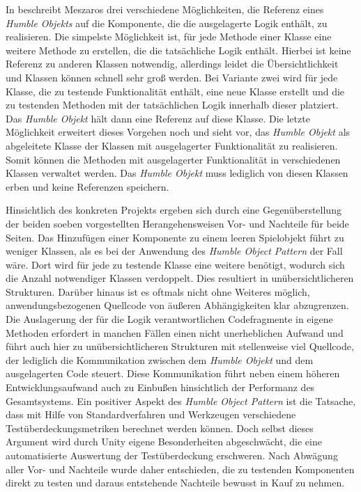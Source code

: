 In \cite{xUnit_Test_Patterns_Refactoring} beschreibt Meszaros drei verschiedene Möglichkeiten, die Referenz eines \textit{Humble Objekts} auf die Komponente, die die ausgelagerte Logik enthält, zu realisieren. Die simpelste Möglichkeit ist, für jede Methode einer Klasse eine weitere Methode zu erstellen, die die tatsächliche Logik enthält. Hierbei ist keine Referenz zu anderen Klassen notwendig, allerdings leidet die Übersichtlichkeit und Klassen können schnell sehr groß werden. Bei Variante zwei wird für jede Klasse, die zu testende Funktionalität enthält, eine neue Klasse erstellt und die zu testenden Methoden mit der tatsächlichen Logik innerhalb dieser platziert. Das \textit{Humble Objekt} hält dann eine Referenz auf diese Klasse. Die letzte Möglichkeit erweitert dieses Vorgehen noch und sieht vor, das \textit{Humble Objekt} als abgeleitete Klasse der Klassen mit ausgelagerter Funktionalität zu realisieren. Somit können die Methoden mit ausgelagerter Funktionalität in verschiedenen Klassen verwaltet werden. Das \textit{Humble Objekt} muss lediglich von diesen Klassen erben und keine Referenzen speichern.

Hinsichtlich des konkreten Projekts ergeben sich durch eine Gegenüberstellung der beiden soeben vorgestellten Herangehensweisen Vor- und Nachteile für beide Seiten. Das Hinzufügen einer Komponente zu einem leeren Spielobjekt führt zu weniger Klassen, als es bei der Anwendung des \textit{Humble Object Pattern} der Fall wäre. Dort wird für jede zu testende Klasse eine weitere benötigt, wodurch sich die Anzahl notwendiger Klassen verdoppelt. Dies resultiert in unübersichtlicheren Strukturen. Darüber hinaus ist es oftmals nicht ohne Weiteres möglich, anwendungsbezogenen Quellcode von äußeren Abhängigkeiten klar abzugrenzen. Die Auslagerung der für die Logik verantwortlichen Codefragmente in eigene Methoden erfordert in manchen Fällen einen nicht unerheblichen Aufwand und führt auch hier zu unübersichtlicheren Strukturen mit stellenweise viel Quellcode, der lediglich die Kommunikation zwischen dem \textit{Humble Objekt} und dem ausgelagerten Code steuert. Diese Kommunikation führt neben einem höheren Entwicklungsaufwand auch zu Einbußen hinsichtlich der Performanz des Gesamtsystems. Ein positiver Aspekt des \textit{Humble Object Pattern} ist die Tatsache, dass mit Hilfe von Standardverfahren und Werkzeugen verschiedene Testüberdeckungsmetriken berechnet werden können. Doch selbst dieses Argument wird durch Unity eigene Besonderheiten abgeschwächt, die eine automatisierte Auswertung der Testüberdeckung erschweren. Nach Abwägung aller Vor- und Nachteile wurde daher entschieden, die zu testenden Komponenten direkt zu testen und daraus entstehende Nachteile bewusst in Kauf zu nehmen. 


